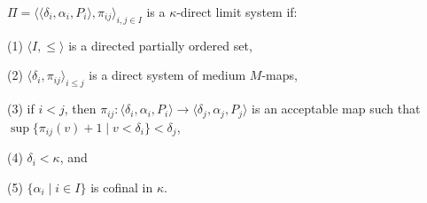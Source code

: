 $\Pi = \langle \langle \delta_i, \alpha_i, P_i \rangle, \pi_{ij} \rangle_{i,j \in I}$ is a $\kappa$-direct limit system if:

(1) $\langle I, \leq \rangle$ is a directed partially ordered set,

(2) $\langle \delta_i, \pi_{ij} \rangle_{i \leq j}$ is a direct system of medium $M$-maps,

(3) if $i < j$, then $\pi_{ij} : \langle \delta_i, \alpha_i, P_i \rangle \rightarrow \langle \delta_j, \alpha_j, P_j \rangle$ is an acceptable map such that $\sup \{\pi_{ij}(v) + 1 \mid v < \delta_i \} < \delta_j$,

(4) $\delta_i < \kappa$, and

(5) $\{\alpha_i \mid i \in I\}$ is cofinal in $\kappa$.
